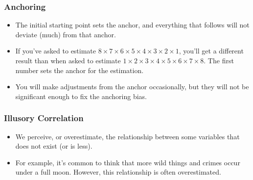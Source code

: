 \documentclass[]{article}
\begin{document}
			\subsubsection{Anchoring}
				\begin{itemize}
					\item The initial starting point sets the anchor, and everything that follows will not deviate (much) from that anchor.
					\item If you've asked to estimate $8 \times 7 \times 6 \times 5 \times 4 \times 3 \times 2 \times 1$, you'll get a different result than when asked to estimate $1 \times 2 \times 3 \times 4 \times 5 \times 6 \times 7 \times 8$. The first number sets the anchor for the estimation.
					\item You will make adjustments from the anchor occasionally, but they will not be significant enough to fix the anchoring bias.
				\end{itemize}

			\subsubsection{Illusory Correlation}
				\begin{itemize}
					\item We perceive, or overestimate, the relationship between some variables that does not exist (or is less).
					\item For example, it's common to think that more wild things and crimes occur under a full moon. However, this relationship is often overestimated.
				\end{itemize}
\end{document}
